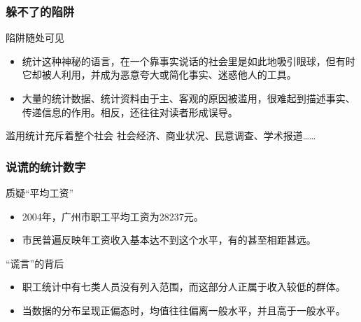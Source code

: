 \begin{frame}
  \frametitle{躲不了的陷阱}
  \begin{block}{陷阱随处可见}
    \begin{itemize}
      \item 统计这种神秘的语言，在一个靠事实说话的社会里是如此地吸引眼球，但有时它却被人利用，并成为恶意夸大或简化事实、迷惑他人的工具。
      \item 大量的统计数据、统计资料由于主、客观的原因被滥用，很难起到描述事实、传递信息的作用。相反，还往往对读者形成误导。
    \end{itemize}
  \end{block}
  \pause
  \begin{block}{滥用统计充斥着整个社会}
    社会经济、商业状况、民意调查、学术报道……
  \end{block}
\end{frame}

\begin{frame}
  \frametitle{说谎的统计数字}
  \begin{block}{质疑“平均工资”}
    \begin{itemize}
      \item 2004年，广州市职工平均工资为28237元。
      \item 市民普遍反映年工资收入基本达不到这个水平，有的甚至相距甚远。
    \end{itemize}
  \end{block}
  \pause
  \begin{block}{“谎言”的背后}
    \begin{itemize}
      \item 职工统计中有七类人员没有列入范围，而这部分人正属于收入较低的群体。
      \item 当数据的分布呈现正偏态时，均值往往偏离一般水平，并且高于一般水平。
    \end{itemize}
  \end{block}
\end{frame}


